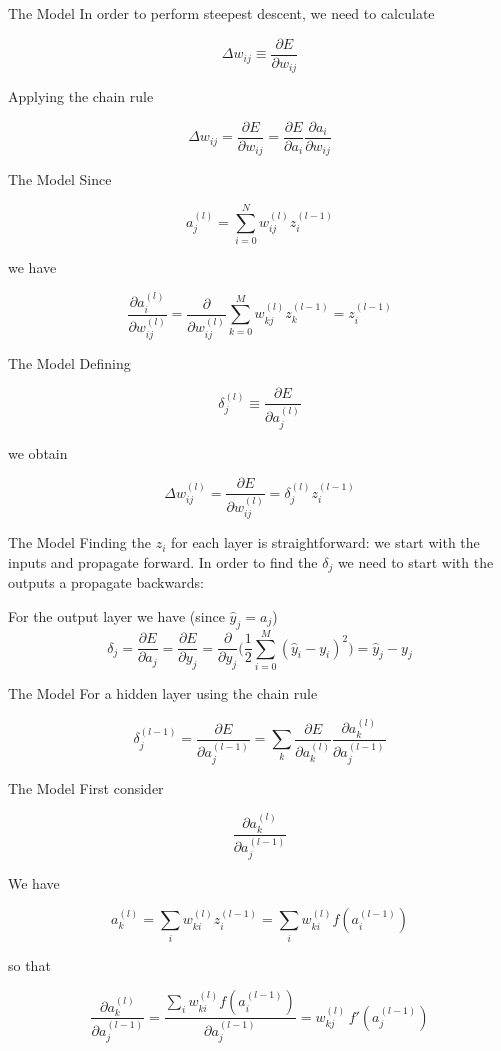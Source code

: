 \documentclass{beamer}
\begin{document}
\begin{frame}[fragile]{The Model}
In order to perform steepest descent, we need to calculate

$$
\Delta w_{ij} \equiv \frac{\partial E}{\partial w_{ij}}
$$

Applying the chain rule

$$
\Delta w_{ij} =
\frac{\partial E}{\partial w_{ij}} =
\frac{\partial E}{\partial a_i}\frac{\partial a_i}{\partial w_{ij}}
$$
\end{frame}

\begin{frame}[fragile]{The Model}
Since

$$
a_j^{(l)} = \sum_{i=0}^N w_{ij}^{(l)}z_i^{(l-1)}
$$

we have

$$
\frac{\partial a_i^{(l)}}{\partial w_{ij}^{(l)}} =
\frac{\partial}{\partial w_{ij}^{(l)}}\sum_{k=0}^M w_{kj}^{(l)}z_k^{(l-1)} =
z_i^{(l-1)}
$$
\end{frame}

\begin{frame}[fragile]{The Model}
Defining

$$
\delta_j^{(l)} \equiv
\frac{\partial E}{\partial a_j^{(l)}}
$$

we obtain

$$
\Delta w_{ij}^{(l)} =
\frac{\partial E}{\partial w_{ij}^{(l)}} =
\delta_j^{(l)} z_i^{(l-1)}
$$
\end{frame}

\begin{frame}[fragile]{The Model}
Finding the $z_i$ for each layer is straightforward: we start with the
inputs and propagate forward. In order to find the $\delta_j$ we need
to start with the outputs a propagate backwards:

For the output layer we have (since $\hat{y}_j = a_j$)
$$
\delta_j = \frac{\partial E}{\partial a_j} = \frac{\partial E}{\partial y_j} = \frac{\partial}{\partial y_j}\bigg(\frac{1}{2}\sum_{i=0}^M (\hat{y}_i - y_i)^2\bigg) = \hat{y}_j - y_j
$$
\end{frame}

\begin{frame}[fragile]{The Model}
For a hidden layer using the chain rule

$$
\delta_j^{(l-1)} = \frac{\partial E}{\partial a_j^{(l-1)}} =
\sum_k \frac{\partial E}{\partial a_k^{(l)}}\frac{\partial a_k^{(l)}}{\partial a_j^{(l-1)}}
$$
\end{frame}

\begin{frame}[fragile]{The Model}
First consider

$$
\frac{\partial a_k^{(l)}}{\partial a_j^{(l-1)}}
$$

We have

$$
a_k^{(l)} = \sum_i w_{ki}^{(l)}z_i^{(l-1)} = \sum_i w_{ki}^{(l)} f(a_i^{(l-1)})
$$

so that

$$
\frac{\partial a_k^{(l)}}{\partial a_j^{(l-1)}} =
\frac{\sum_i w_{ki}^{(l)} f(a_i^{(l-1)})}{\partial a_j^{(l-1)}} =
w_{kj}^{(l)}\,f'(a_j^{(l-1)})
$$
\end{frame}
\end{document}
